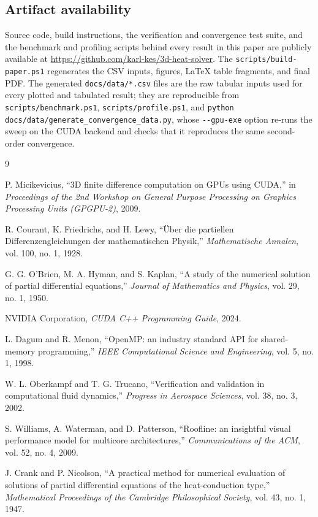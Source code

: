 \documentclass[conference]{IEEEtran}
\begin{document}
\subsection*{Artifact availability}

Source code, build instructions, the verification and convergence test suite, and
the benchmark and profiling scripts behind every result in this paper are publicly
available at \url{https://github.com/karl-kes/3d-heat-solver}. The
\texttt{scripts/build-paper.ps1} regenerates the CSV inputs, figures, LaTeX table
fragments, and final PDF. The generated \texttt{docs/data/*.csv} files are the raw
tabular inputs used for every plotted and tabulated result; they are reproducible from
\texttt{scripts/benchmark.ps1}, \texttt{scripts/profile.ps1}, and
\texttt{python docs/data/generate\_convergence\_data.py}, whose \texttt{-{}-gpu-exe}
option re-runs the sweep on the CUDA backend and checks that it reproduces the same
second-order convergence.

\begin{thebibliography}{9}

P. Micikevicius, ``3D finite difference computation on GPUs using CUDA,'' in
\emph{Proceedings of the 2nd Workshop on General Purpose Processing on Graphics
Processing Units (GPGPU-2)}, 2009.

R. Courant, K. Friedrichs, and H. Lewy, ``\"Uber die partiellen Differenzengleichungen
der mathematischen Physik,'' \emph{Mathematische Annalen}, vol. 100, no. 1, 1928.

G. G. O'Brien, M. A. Hyman, and S. Kaplan, ``A study of the numerical solution of
partial differential equations,'' \emph{Journal of Mathematics and Physics}, vol. 29,
no. 1, 1950.

NVIDIA Corporation, \emph{CUDA C++ Programming Guide}, 2024.

L. Dagum and R. Menon, ``OpenMP: an industry standard API for shared-memory
programming,'' \emph{IEEE Computational Science and Engineering}, vol. 5, no. 1, 1998.

W. L. Oberkampf and T. G. Trucano, ``Verification and validation in computational
fluid dynamics,'' \emph{Progress in Aerospace Sciences}, vol. 38, no. 3, 2002.

S. Williams, A. Waterman, and D. Patterson, ``Roofline: an insightful visual
performance model for multicore architectures,'' \emph{Communications of the ACM},
vol. 52, no. 4, 2009.

J. Crank and P. Nicolson, ``A practical method for numerical evaluation of solutions
of partial differential equations of the heat-conduction type,'' \emph{Mathematical
Proceedings of the Cambridge Philosophical Society}, vol. 43, no. 1, 1947.

\end{thebibliography}
\end{document}
